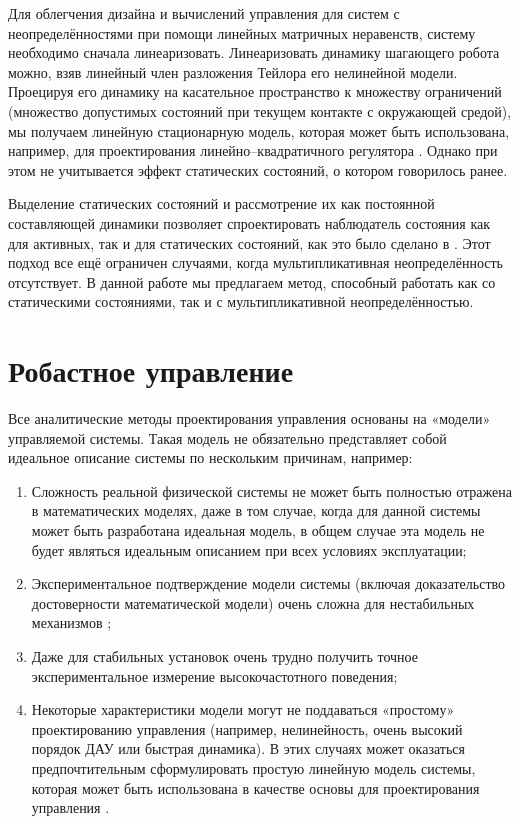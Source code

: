 Для облегчения дизайна и вычислений управления для систем с неопределённостями при помощи линейных матричных неравенств, систему необходимо сначала линеаризовать. Линеаризовать динамику шагающего робота можно, взяв линейный член разложения Тейлора его нелинейной модели. Проецируя его динамику на касательное пространство к множеству ограничений (множество допустимых состояний при текущем контакте с окружающей средой), мы получаем линейную стационарную модель, которая может быть использована, например, для проектирования линейно--квадратичного регулятора \cite{mason2014full}. Однако при этом не учитывается эффект статических состояний, о котором говорилось ранее.

Выделение статических состояний и рассмотрение их как постоянной составляющей динамики позволяет спроектировать наблюдатель состояния как для активных, так и для статических состояний, как это было сделано в \cite{SAVIN2021}. Этот подход все ещё ограничен случаями, когда мультипликативная неопределённость отсутствует. В данной работе мы предлагаем метод, способный работать как со статическими состояниями, так и с мультипликативной неопределённостью.

\section{Робастное управление}\label{sec:ch1/sec4}
Все аналитические методы проектирования управления основаны на «модели» управляемой системы. Такая модель не обязательно представляет собой идеальное описание системы по нескольким причинам, например:
\begin{enumerate}[beginpenalty=10000]
	\item Сложность реальной физической системы не может быть полностью отражена в математических моделях, даже в том случае, когда для данной системы может быть разработана идеальная модель, в общем случае эта модель не будет являться идеальным описанием при всех условиях эксплуатации;
	\item Экспериментальное подтверждение модели системы (включая доказательство достоверности математической модели) очень сложна для нестабильных механизмов \cite{Oral2022};
	\item Даже для стабильных установок очень трудно получить точное экспериментальное измерение высокочастотного поведения;
	\item Некоторые характеристики модели могут не поддаваться «простому» проектированию управления (например, нелинейность, очень высокий порядок ДАУ или быстрая динамика). В этих случаях может оказаться предпочтительным сформулировать простую линейную модель системы, которая может быть использована в качестве основы для проектирования управления \cite{barmish1994new, Garulli2000}.
\end{enumerate}


